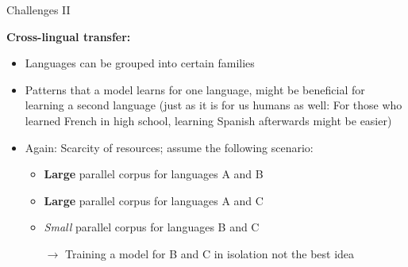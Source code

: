 
\begin{vbframe}{Challenges II}

\vfill

\textbf{Cross-lingual transfer:}

\begin{itemize}
	\item Languages can be grouped into certain families
	\item Patterns that a model learns for one language, might be beneficial for learning a second language 
				(just as it is for us humans as well: For those who learned French in high school, learning Spanish
				afterwards might be easier)
	\item Again: Scarcity of resources; assume the following scenario:
		\begin{itemize}
			\item \textbf{Large} parallel corpus for languages A and B
			\item \textbf{Large} parallel corpus for languages A and C
			\item \textit{Small} parallel corpus for languages B and C
			\item[$\to$] Training a model for B and C in isolation not the best idea
		\end{itemize}
\end{itemize}

\vfill

\end{vbframe}

\endlecture

